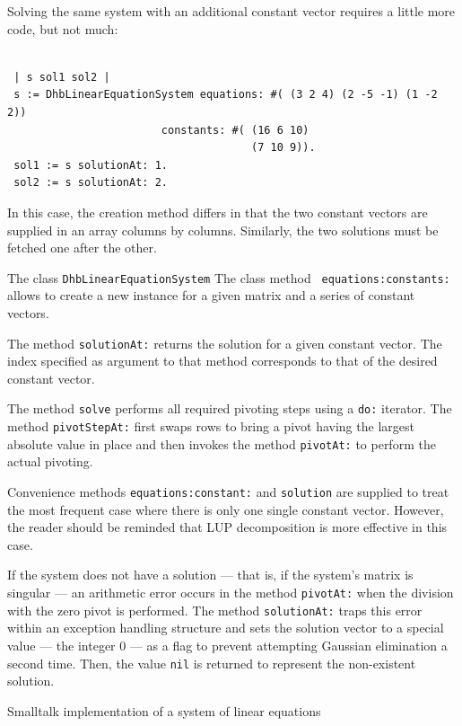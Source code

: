 \documentclass[twoside]{book}
\begin{document}
Solving the same system with an additional constant vector
requires a little more code, but not much:
\begin{codeExample}
\begin{verbatim}

 | s sol1 sol2 |
 s := DhbLinearEquationSystem equations: #( (3 2 4) (2 -5 -1) (1 -2 2))
                        constants: #( (16 6 10)
                                      (7 10 9)).
 sol1 := s solutionAt: 1.
 sol2 := s solutionAt: 2.
\end{verbatim}
\end{codeExample}
In this case, the creation method differs in that the two constant
vectors are supplied in an array columns by columns. Similarly,
the two solutions must be fetched one after the other.

The class {\tt DhbLinearEquationSystem} The class method {\tt
equations:constants:} allows to create a new instance for a given
matrix and a series of constant vectors.

The method {\tt solutionAt:} returns the solution for a given
constant vector. The index specified as argument to that method
corresponds to that of the desired constant vector.


The method {\tt solve} performs all required pivoting steps using
a {\tt do:} iterator. The method {\tt pivotStepAt:} first swaps
rows to bring a pivot having the largest absolute value in place
and then invokes the method {\tt pivotAt:} to perform the actual
pivoting.

Convenience methods {\tt equations:constant:} and {\tt solution}
are supplied to treat the most frequent case where there is only
one single constant vector. However, the reader should be reminded
that LUP decomposition is more effective in this case.

If the system does not have a solution --- that is, if the
system's matrix is singular --- an arithmetic error occurs in the
method {\tt pivotAt:} when the division with the zero pivot is
performed. The method {\tt solutionAt:} traps this error within an
exception handling structure and sets the solution vector to a
special value --- the integer 0 --- as a flag to prevent
attempting Gaussian elimination a second time. Then, the value
{\tt nil} is returned to represent the non-existent solution.

\begin{listing} Smalltalk implementation of a system of linear equations
\label{ls:lineqs}

\end{listing}
\end{document}
